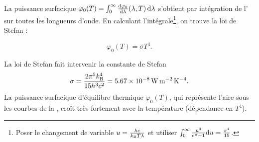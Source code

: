 \documentclass[12pt,fancy]{cours}
\begin{document}
La puissance surfacique $\varphi_0(T) = \int_{0}^{\infty}\frac{\mathrm{d}{\varphi_0}}{\mathrm{d}{\lambda}}(\lambda,T)\,\mathrm{d}\lambda$ s'obtient par intégration de l' sur toutes les longueurs d'onde.
En calculant l'intégrale\footnote{Poser le changement de variable $u=\frac{hc}{k_{\rm{B}}T\lambda}$ et utiliser $\int_{0}^{\infty}\frac{u^3}{\mathrm{e}^{u}-1}\mathrm{d} u=\frac{\pi^4}{15}$.}, on trouve la loi de Stefan :
\begin{theorem}\label{form:stefan}
\begin{equation*}
\varphi_0(T)=\sigma T^{4}.
\end{equation*}
\end{theorem}
\noindent La loi de Stefan fait intervenir la constante de Stefan
\begin{equation}
\sigma=\frac{2\pi^5 k_{\rm{B}}^4}{15h^3c^2}=\SI{5,67e-8}{W.m^{-2}.K^{-4}}.
\end{equation}
La puissance surfacique d'équilibre thermique $\varphi_0(T)$, qui représente l'aire sous les courbes de la , croît très fortement avec la température (dépendance en $T^4$).
\end{document}
